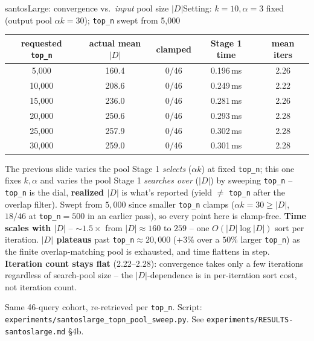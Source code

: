 \documentclass[aspectratio=169,10pt]{beamer}
\newcommand{\highlight}[1]{{\color{Cat1}\bfseries #1}}
\begin{document}
\begin{frame}{santosLarge: convergence vs.\ \emph{input} pool size $|D|$}{Setting: $k{=}10,\alpha{=}3$ fixed (output pool $\alpha k{=}30$); \texttt{top\_n} swept from 5{,}000}
\footnotesize
\begin{center}
\begin{tabular}{ccccc}
\toprule
requested \texttt{top\_n} & actual mean $|D|$ & clamped & Stage 1 time & mean iters \\
\midrule
5{,}000 & 160.4 & 0/46 & 0.196\,ms & 2.26 \\
10{,}000 & 208.6 & 0/46 & 0.249\,ms & 2.22 \\
15{,}000 & 236.0 & 0/46 & 0.281\,ms & 2.26 \\
20{,}000 & 250.6 & 0/46 & 0.293\,ms & 2.28 \\
25{,}000 & 257.9 & 0/46 & 0.302\,ms & 2.28 \\
30{,}000 & 259.0 & 0/46 & 0.301\,ms & 2.28 \\
\bottomrule
\end{tabular}
\end{center}

\vspace{4pt}
\small\color{Ink2}
The previous slide varies the pool Stage 1 \emph{selects} ($\alpha k$) at fixed \texttt{top\_n}; this one fixes $k,\alpha$ and varies the pool Stage 1 \emph{searches over} ($|D|$) by sweeping \texttt{top\_n} -- \texttt{top\_n} is the dial, \highlight{realized $|D|$} is what's reported (yield $\ne$ \texttt{top\_n} after the overlap filter). Swept from $5{,}000$ since smaller \texttt{top\_n} clamps ($\alpha k{=}30\ge|D|$, $18/46$ at \texttt{top\_n}$=500$ in an earlier pass), so every point here is clamp-free. \highlight{Time scales with $|D|$} -- $\sim\!1.5\times$ from $|D|{\approx}160$ to $259$ -- one $O(|D|\log|D|)$ sort per iteration. \highlight{$|D|$ plateaus} past \texttt{top\_n}$\approx\!20{,}000$ ($+3\%$ over a $50\%$ larger \texttt{top\_n}) as the finite overlap-matching pool is exhausted, and time flattens in step. \highlight{Iteration count stays flat} (2.22--2.28): convergence takes only a few iterations regardless of search-pool size -- the $|D|$-dependence is in per-iteration sort cost, not iteration count.

\vspace{2pt}
{\footnotesize\color{Muted} Same 46-query cohort, re-retrieved per \texttt{top\_n}. Script: \texttt{experiments/santoslarge\_topn\_pool\_sweep.py}. See \texttt{experiments/RESULTS-santoslarge.md} \S4b.}
\end{frame}
\end{document}
